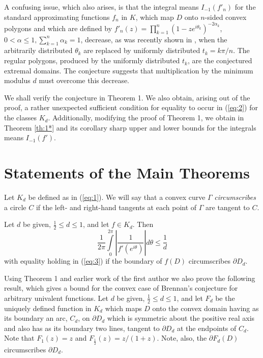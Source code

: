 A confusing issue, which also arises, is that the integral means
$I_{-1}(f'_n)$ for the standard approximating functions $f_n$ in $K$,
which map $D$ onto $n$-sided convex polygons and which are defined by
$f'_n (z)=\prod^n_{k=1} (1-ze^{i\theta_k})^{-2\alpha_k}$, $0<\alpha
\leq 1, \sum^n_{k=1}\alpha_k=1$, decrease, as was recently shown in
\cite{1}, when the arbitrarily distributed $\theta_k$ are replaced by
uniformly distributed $t_k=k\pi/n$.  The regular polygons, produced by
the uniformly distributed $t_k$, are the conjectured extremal domains.
 The conjecture suggests that multiplication by the minimum modulus
$d$ must overcome this decrease.

We shall verify the conjecture in Theorem 1.  We also obtain, arising
out of the proof, a rather unexpected sufficient condition for
equality to occur in (\ref{eq:2}) for the classes $K_d$.
Additionally, modifying the proof of Theorem 1, we obtain in Theorem
\ref{th:1*} and its corollary sharp upper and lower bounds for the
integrals means $I_{-1} (f')$.

\section{Statements of the Main Theorems}

Let $K_d$ be defined as in (\ref{eq:1}).  We will say that a convex
curve $\Gamma$ {\em circumscribes} a circle $C$ if the left- and right-hand
tangents at each point of $\Gamma$ are tangent to $C$.

\begin{theorem}\label{th:1}
 Let $d$ be given, $\frac{1}{2}\leq d\leq 1$, and let
$f\in K_d$.  Then
\begin{equation}
\label{eq:3}
\frac{1}{2\pi} \int\limits^{2\pi}_{0}
\left|\frac{1}{f'(e^{i\theta})}\right|d\theta\leq \frac{1}{d}
\end{equation}
with equality holding in {\rm (\ref{eq:3})} if the boundary of $f(D)$
circumscribes $\partial D_d$.
\end{theorem}

Using Theorem 1 and earlier work of the first author we also prove
the following result, which gives a bound for the convex case
of Brennan's conjecture \cite{5} for arbitrary univalent functions.
Let $d$ be given, $\frac{1}{2} \leq d\leq 1$, and let $F_d$ be the
uniquely defined function in $K_d$ which maps $D$ onto the convex
domain having as its boundary an arc, $C_d$, on $\partial D_d$ which
is symmetric about the positive real axis and also
has as its boundary two lines, tangent to $\partial D_d$ at the
endpoints of $C_d$.  Note that $F_1(z)=z$ and
$F_{\frac{1}{2}}(z)=z/(1+z)$.  Note, also, the $\partial F_d(D)$
circumscribes $\partial D_d$.


